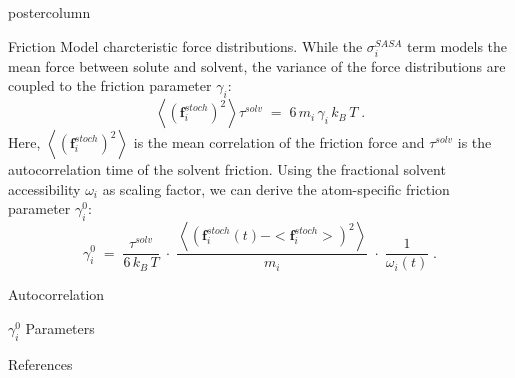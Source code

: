 \documentclass{beamer}
\newcommand{\sig}{$\sigma_i^{SASA}$}
\newcommand{\gam}{$\gamma_i^0$}
\begin{document}
\begin{frame}
\begin{columns}
\begin{column}{.45\textwidth}
\begin{beamercolorbox}[center]{postercolumn}
\begin{minipage}{.98\textwidth}
{\begin{myblock}{Friction Model}
charcteristic force distributions. While the \sig{} term models the mean
force between solute and solvent, the variance of the force distributions
are coupled to the friction parameter $\gamma_i$:
\begin{equation}
\left< (\mathbf{f}_i^{stoch})^2 \right> \tau^{solv} \; = \; 6 \, m_i \, \gamma_i \, k_B \, T \; .
\label{eq:stoch}
\end{equation}
Here, $\left< (\mathbf{f}_i^{stoch})^2 \right>$ is the mean correlation of the
friction force and $\tau^{solv}$ is the autocorrelation time of the solvent friction.
Using the fractional solvent accessibility $\omega_i$ as scaling factor,
we can derive the atom-specific friction parameter \gam:
\begin{equation}
\gamma^0_i \; = \; \frac{\tau^{solv}}{{6 \, k_B \, T}} \; \cdot \; \frac{\left< (\mathbf{f}_i^{stoch}(t) - <\mathbf{f}_i^{stoch}>)^2 \right>}{m_i} \; \cdot \; \frac{1}{\omega_i(t)} \; .
\label{eq:gamma0}
\end{equation} 
\end{myblock}\vfill
\begin{myblock}{Autocorrelation}

\end{myblock}\vfill
\begin{myblock}{\gam{} Parameters}

\end{myblock}\vfill
\begin{myblock}{References}
\footnotesize


\end{myblock}\vfill
}\end{minipage}
\end{beamercolorbox}
\end{column}
\end{columns}
\end{frame}
\end{document}
